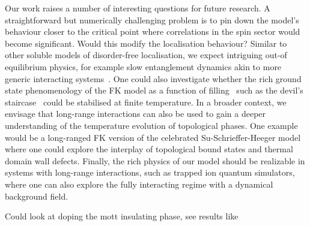 Our work raises a number of interesting questions for future research. A straightforward but numerically challenging problem is to pin down the model's behaviour closer to the critical point where correlations in the spin sector would become significant. Would this modify the localisation behaviour? Similar to other soluble models of disorder-free localisation, we expect intriguing out-of equilibrium physics, for example slow entanglement dynamics akin to more generic interacting systems~\autocite{hartLogarithmicEntanglementGrowth2020}. One could also investigate whether the rich ground state phenomenology of the FK model as a function of filling~\autocite{gruberGroundStatesSpinless1990} such as the devil's staircase~\autocite{michelettiCompleteDevilTextquotesingles1997} could be stabilised at finite temperature. In a broader context, we envisage that long-range interactions can also be used to gain a deeper understanding of the temperature evolution of topological phases. One example would be a long-ranged FK version of the celebrated Su-Schrieffer-Heeger model where one could explore the interplay of topological bound states and thermal domain wall defects. Finally, the rich physics of our model should be realizable in systems with long-range interactions, such as trapped ion quantum simulators, where one can also explore the fully interacting regime with a dynamical background field.

Could look at doping the mott insulating phase, see results like~\autocite{caiVisualizingEvolutionMott2016}
